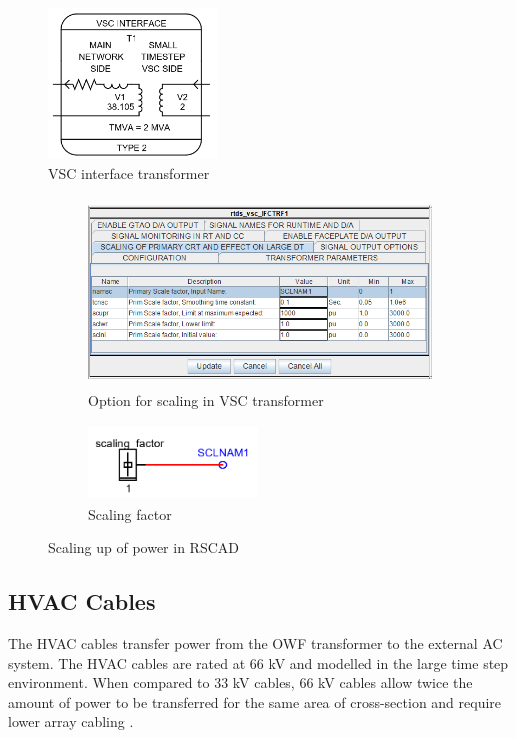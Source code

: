 \begin{figure}[H]
\centering
    \includegraphics[height = 4cm,width = 4.5cm]{Diagrams/Chapter_3/VSC_interface_trafo_smalldt.PNG}
    \caption{VSC interface transformer}
    \label{fig:VSC_interface_trafo_smalldt}
\end{figure}
\vspace{0 mm}
\begin{figure}[H]
\centering
\begin{subfigure}{.55\textwidth}
  \centering
  \includegraphics[height=5cm,width=10cm]{Diagrams/Chapter_3/VSC_interface_trafo_scaling.PNG}
  \caption{Option for scaling in VSC transformer}
  \label{fig:VSC_interface_trafo_scaling}
\end{subfigure}%
\begin{subfigure}{.5\textwidth}
  \centering
  \includegraphics[height=2cm,width=4.5cm]{Diagrams/Chapter_3/scaling_factor_RSCAD.PNG}
  \caption{Scaling factor}
  \label{fig:scaling_factor_RSCAD}
\end{subfigure}
\caption{Scaling up of power in RSCAD}
\label{fig:VSC_trafo_options}
\end{figure}

\subsection{HVAC Cables}\label{HVAC_cable_RSCAD}
The \gls{HVAC} cables transfer power from the \gls{OWF} transformer to the external \gls{AC} system. The \gls{HVAC} cables are rated at 66 kV and modelled in the large time step environment. When compared to 33 kV cables, 66 kV cables allow twice the amount of power to be transferred for the same area of cross-section and require lower array cabling \cite{dnv66kv}. 
 
